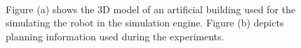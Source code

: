 \begin{figure}[thpb]
     \footnotesize
      \centering
      \myfloatalign
      \setlength\fboxsep{0pt}
      \setlength\fboxrule{0.5pt}
       \\
       \caption[Simulation: artificial environment]{Figure (a) shows the 3D model of an artificial building used for the simulating the robot in the simulation engine. Figure (b) depicts planning information used during the experiments.}
      \label{fig:gazebo_v4r}
   \end{figure}

